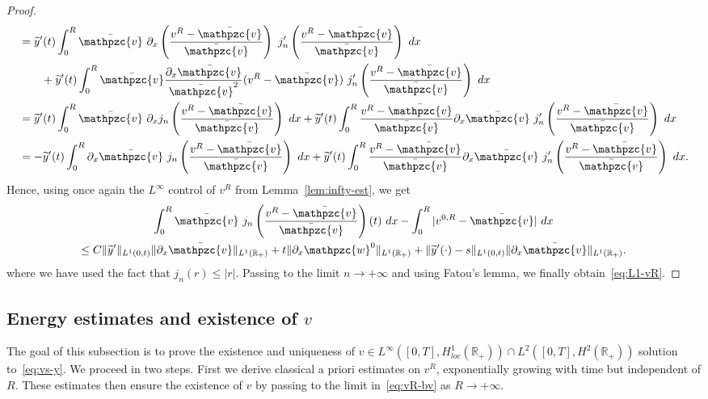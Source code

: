 \documentclass[AHL,Unicode,longabstracts,published]{cedram}
\newcommand{\R}{\mathbb{R}}
\newcommand{\bv}{\bar{\mathpzc{v}}}
\newcommand{\tw}{\mathpzc{w}}
\newcommand{\ty}{\widetilde{y}}
\begin{document}
\begin{proof}
\begin{multline*}
\begin{aligned}
& = \ty'(t) \int_0^R \bv \ \partial_x\left(\frac{v^R -\bv}{\bv}\right)\ j_n'\left(\frac{v^R -\bv}{\bv}\right) \ dx \\
&\qquad+ \ty'(t) \int_0^R \bv \frac{\partial_x \bv}{\bv^2} (v^R -\bv)\ j_n'\left(\frac{v^R -\bv}{\bv}\right) \ dx \\
& = \ty'(t) \int_0^R \bv \ \partial_x j_n\left(\frac{v^R -\bv}{\bv}\right) \ dx + \ty'(t) \int_0^R \dfrac{v^R -\bv}{\bv} \partial_x \bv \ j'_n\left(\frac{v^R -\bv}{\bv}\right) \ dx \\
& = - \ty'(t) \int_0^R \partial_x \bv \ j_n\left(\frac{v^R-\bv}{\bv}\right) \ dx + \ty'(t) \int_0^R \dfrac{v^R -\bv}{\bv} \partial_x \bv \ j'_n\left(\frac{v^R -\bv}{\bv}\right) \ dx.
\end{aligned}
\end{multline*}
Hence, using once again the $L^\infty$ control of $v^R$ from Lemma~\ref{lem:infty-est}, we get
\begin{multline*}
\int_0^R \bv \ j_n\left(\frac{v^R -\bv}{\bv}\right)(t) \ dx - \int_0^R |v^{0,R} -\bv| \ dx \\
\leq C \|\ty'\|_{L^1(0,t)} \|\partial_x \bv\|_{L^1(\R_+)} + t \|\partial_x \tw^0\|_{L^1(\R_+)} + \|\ty'(\cdot) -s\|_{L^1(0,t)} \|\partial_x \bv\|_{L^1(\R_+)}.
\end{multline*}
where we have used the fact that $j_n(r) \leq |r|$. Passing to the limit $n\to +\infty$ and using Fatou’s lemma, we finally obtain~\eqref{eq:L1-vR}.
\end{proof}



\subsection{Energy estimates and existence of \texorpdfstring{$v$}{v}}\label{sec:existence-v}



The goal of this subsection is to prove the existence and uniqueness of $v \in L^\infty([0,T], H^1_{loc}(\R_+))\cap L^2([0,T], H^2(\R_+))$ solution to~\eqref{eq:vs-y}. We proceed in two steps. First we derive classical a priori estimates on $v^R$, exponentially growing with time but independent of $R$. These estimates then ensure the existence of $v$ by passing to the limit in~\eqref{eq:vR-bv} as $R\to +\infty$.
\end{document}
